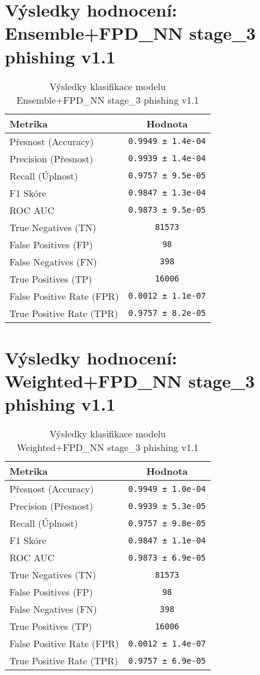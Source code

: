 \section*{Výsledky hodnocení: Ensemble+FPD_NN stage_3 phishing v1.1}
\begin{table}[h!]
\centering
\begin{tabular}{|l|c|}
\hline
\textbf{Metrika} & \textbf{Hodnota} \\
\hline
Přesnost (Accuracy) & \texttt{0.9949 ± 1.4e-04} \\
Precision (Přesnost) & \texttt{0.9939 ± 1.4e-04} \\
Recall (Úplnost) & \texttt{0.9757 ± 9.5e-05} \\
F1 Skóre & \texttt{0.9847 ± 1.3e-04} \\
ROC AUC & \texttt{0.9873 ± 9.5e-05} \\
True Negatives (TN) & \texttt{81573} \\
False Positives (FP) & \texttt{98} \\
False Negatives (FN) & \texttt{398} \\
True Positives (TP) & \texttt{16006} \\
False Positive Rate (FPR) & \texttt{0.0012 ± 1.1e-07} \\
True Positive Rate (TPR) & \texttt{0.9757 ± 8.2e-05} \\
\hline
\end{tabular}
\caption{Výsledky klasifikace modelu Ensemble+FPD_NN stage_3 phishing v1.1}
\label{tab:phishing_ensemble+fpd_nn}
\end{table}

\section*{Výsledky hodnocení: Weighted+FPD_NN stage_3 phishing v1.1}
\begin{table}[h!]
\centering
\begin{tabular}{|l|c|}
\hline
\textbf{Metrika} & \textbf{Hodnota} \\
\hline
Přesnost (Accuracy) & \texttt{0.9949 ± 1.0e-04} \\
Precision (Přesnost) & \texttt{0.9939 ± 5.3e-05} \\
Recall (Úplnost) & \texttt{0.9757 ± 9.8e-05} \\
F1 Skóre & \texttt{0.9847 ± 1.1e-04} \\
ROC AUC & \texttt{0.9873 ± 6.9e-05} \\
True Negatives (TN) & \texttt{81573} \\
False Positives (FP) & \texttt{98} \\
False Negatives (FN) & \texttt{398} \\
True Positives (TP) & \texttt{16006} \\
False Positive Rate (FPR) & \texttt{0.0012 ± 1.4e-07} \\
True Positive Rate (TPR) & \texttt{0.9757 ± 6.9e-05} \\
\hline
\end{tabular}
\caption{Výsledky klasifikace modelu Weighted+FPD_NN stage_3 phishing v1.1}
\label{tab:phishing_weighted+fpd_nn}
\end{table}

